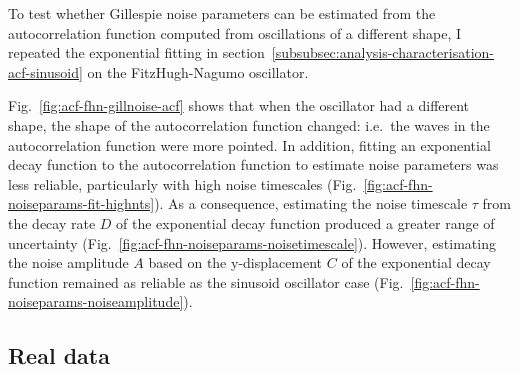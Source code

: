 To test whether Gillespie noise parameters can be estimated from the autocorrelation function computed from oscillations of a different shape, I repeated the exponential fitting in section~\ref{subsubsec:analysis-characterisation-acf-sinusoid} on the FitzHugh-Nagumo oscillator.

Fig.\ \ref{fig:acf-fhn-gillnoise-acf} shows that when the oscillator had a different shape, the shape of the autocorrelation function changed: i.e.\ the waves in the autocorrelation function were more pointed.
In addition, fitting an exponential decay function to the autocorrelation function to estimate noise parameters was less reliable, particularly with high noise timescales (Fig.\ \ref{fig:acf-fhn-noiseparams-fit-highnts}).
As a consequence, estimating the noise timescale $\tau$ from the decay rate $D$ of the exponential decay function produced a greater range of uncertainty (Fig.\ \ref{fig:acf-fhn-noiseparams-noisetimescale}).
However, estimating the noise amplitude $A$ based on the y-displacement $C$ of the exponential decay function remained as reliable as the sinusoid oscillator case (Fig.\ \ref{fig:acf-fhn-noiseparams-noiseamplitude}).


\subsection{Real data}
\label{subsubsec:analysis-characterisation-real}

